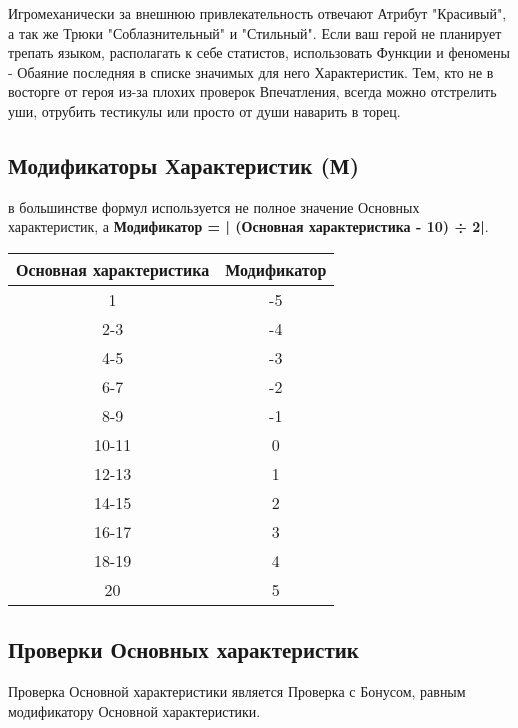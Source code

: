 \begin{tcolorbox}
    Игромеханически за внешнюю привлекательность отвечают Атрибут "Красивый", а так же Трюки "Соблазнительный" и "Стильный". 
    \newline Если ваш герой не планирует трепать языком, располагать к себе статистов, использовать Функции и феномены - Обаяние последняя в списке значимых для него Характеристик. Тем, кто не в восторге от героя из-за плохих проверок Впечатления, всегда можно отстрелить уши, отрубить тестикулы или просто от души наварить в торец.
\end{tcolorbox}

\subsection{Модификаторы Характеристик (М)} в большинстве формул используется не полное значение Основных характеристик, а \textbf{Модификатор = | (Основная характеристика - 10) ÷ 2|}.
\begin{center}
\begin{tabular}{ |c|c| }
\hline
\textbf{Основная характеристика} & \textbf{Модификатор} \\ \hline
  1 & -5 \\ \hline
  2-3 & -4 \\ \hline
  4-5 & -3 \\ \hline
  6-7 & -2 \\ \hline
  8-9 & -1 \\ \hline
  10-11 & 0 \\ \hline
  12-13 & 1 \\ \hline
  14-15 & 2 \\ \hline
  16-17 & 3 \\ \hline
  18-19 & 4 \\ \hline
  20 & 5 \\ \hline
\end{tabular}
\end{center}
\subsection{Проверки Основных характеристик}
Проверка Основной характеристики является Проверка с Бонусом, равным модификатору Основной характеристики.

